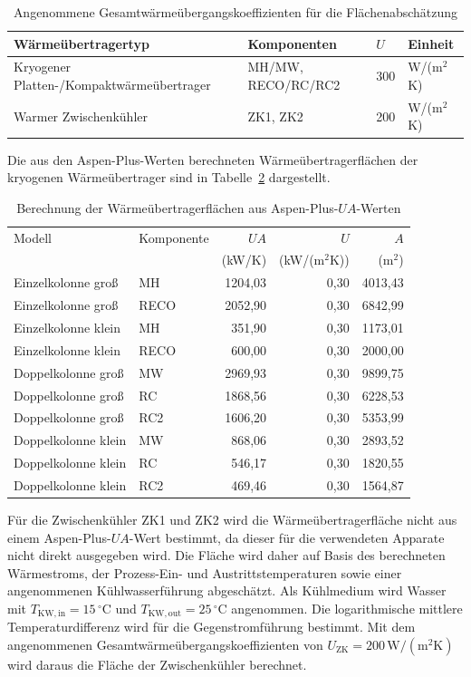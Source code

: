 \begin{table}[H]
\centering
\caption{Angenommene Gesamtwärmeübergangskoeffizienten für die Flächenabschätzung}
\label{tab:u_werte_waermeuebertrager}
\begin{tabular}{llll}
\hline
Wärmeübertragertyp & Komponenten & $U$ & Einheit \\
\hline
Kryogener Platten-/Kompaktwärmeübertrager & MH/MW, RECO/RC/RC2 & 300 & W/(m$^2$K) \\
Warmer Zwischenkühler & ZK1, ZK2 & 200 & W/(m$^2$K) \\
\hline
\end{tabular}
\end{table}

Die aus den Aspen-Plus-Werten berechneten Wärmeübertragerflächen der kryogenen Wärmeübertrager sind in Tabelle~\ref{tab:waermeuebertrager_flaechen} dargestellt.

\begin{table}[H]
\centering
\caption{Berechnung der Wärmeübertragerflächen aus Aspen-Plus-$UA$-Werten}
\label{tab:waermeuebertrager_flaechen}
\begin{tabular}{llrrr}
\hline
Modell & Komponente & $UA$ & $U$ & $A$ \\
 & & (kW/K) & (kW/(m$^2$K)) & (m$^2$) \\
\hline
Einzelkolonne groß & MH   & 1204{,}03 & 0{,}30 & 4013{,}43 \\
Einzelkolonne groß & RECO & 2052{,}90 & 0{,}30 & 6842{,}99 \\
Einzelkolonne klein & MH   & 351{,}90 & 0{,}30 & 1173{,}01 \\
Einzelkolonne klein & RECO & 600{,}00 & 0{,}30 & 2000{,}00 \\
Doppelkolonne groß & MW  & 2969{,}93 & 0{,}30 & 9899{,}75 \\
Doppelkolonne groß & RC  & 1868{,}56 & 0{,}30 & 6228{,}53 \\
Doppelkolonne groß & RC2 & 1606{,}20 & 0{,}30 & 5353{,}99 \\
Doppelkolonne klein & MW  & 868{,}06 & 0{,}30 & 2893{,}52 \\
Doppelkolonne klein & RC  & 546{,}17 & 0{,}30 & 1820{,}55 \\
Doppelkolonne klein & RC2 & 469{,}46 & 0{,}30 & 1564{,}87 \\
\hline
\end{tabular}
\end{table}

Für die Zwischenkühler ZK1 und ZK2 wird die Wärmeübertragerfläche nicht aus einem Aspen-Plus-$UA$-Wert bestimmt, da dieser für die verwendeten Apparate nicht direkt ausgegeben wird. Die Fläche wird daher auf Basis des berechneten Wärmestroms, der Prozess-Ein- und Austrittstemperaturen sowie einer angenommenen Kühlwasserführung abgeschätzt. Als Kühlmedium wird Wasser mit $T_{\mathrm{KW,in}} = 15\,^\circ\mathrm{C}$ und
$T_{\mathrm{KW,out}} = 25\,^\circ\mathrm{C}$ angenommen. Die logarithmische
mittlere Temperaturdifferenz wird für die Gegenstromführung bestimmt. Mit dem
angenommenen Gesamtwärmeübergangskoeffizienten von $U_{\mathrm{ZK}} = 200\,\mathrm{W/(m^2K)}$ wird daraus die Fläche der Zwischenkühler berechnet.

